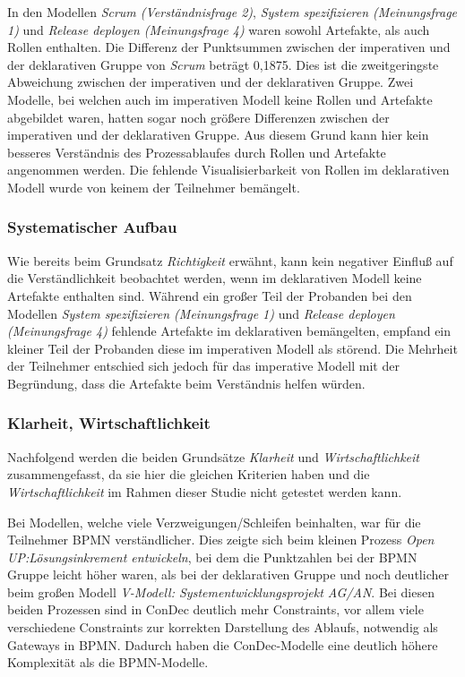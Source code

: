 In den Modellen \textit{Scrum (Verständnisfrage 2)}, \textit{System spezifizieren (Meinungsfrage 1)} und \textit{Release deployen (Meinungsfrage 4)} waren sowohl Artefakte, als auch Rollen enthalten. Die Differenz der Punktsummen zwischen der imperativen und der deklarativen Gruppe von \textit{Scrum} beträgt 0,1875. Dies ist die zweitgeringste Abweichung zwischen der imperativen und der deklarativen Gruppe. Zwei Modelle, bei welchen auch im imperativen Modell keine Rollen und Artefakte abgebildet waren, hatten sogar noch größere Differenzen zwischen der imperativen und der deklarativen Gruppe. Aus diesem Grund kann hier kein besseres Verständnis des Prozessablaufes durch Rollen und Artefakte angenommen werden. \newline
Die fehlende Visualisierbarkeit von Rollen im deklarativen Modell wurde von keinem der Teilnehmer bemängelt.\newline



\subsubsection{Systematischer Aufbau}

Wie bereits beim Grundsatz \textit{Richtigkeit} erwähnt, kann kein negativer Einfluß auf die Verständlichkeit beobachtet werden, wenn im deklarativen Modell keine Artefakte enthalten sind.\newline
Während ein großer Teil der Probanden bei den Modellen \textit{System spezifizieren (Meinungsfrage 1)} und \textit{Release deployen (Meinungsfrage 4)} fehlende Artefakte im deklarativen bemängelten, empfand ein kleiner Teil der Probanden diese im imperativen Modell als störend. Die Mehrheit der Teilnehmer entschied sich jedoch für das imperative Modell mit der Begründung, dass die Artefakte beim Verständnis helfen würden. 

\subsubsection{Klarheit, Wirtschaftlichkeit}



Nachfolgend werden die beiden Grundsätze \textit{Klarheit} und \textit{Wirtschaftlichkeit} zusammengefasst, da sie hier die gleichen Kriterien haben und die \textit{Wirtschaftlichkeit} im Rahmen dieser Studie nicht getestet werden kann.\newline

Bei Modellen, welche viele Verzweigungen/Schleifen beinhalten, war für die Teilnehmer BPMN verständlicher. Dies zeigte sich beim kleinen Prozess \textit{Open UP:Lösungsinkrement entwickeln}, bei dem die Punktzahlen bei der BPMN Gruppe leicht höher waren, als bei der deklarativen Gruppe und noch deutlicher beim großen Modell \textit{V-Modell: Systementwicklungsprojekt AG/AN}. Bei diesen beiden Prozessen sind in ConDec deutlich mehr Constraints, vor allem viele verschiedene Constraints zur korrekten Darstellung des Ablaufs, notwendig als Gateways in BPMN. Dadurch haben die ConDec-Modelle eine deutlich höhere Komplexität als die BPMN-Modelle.\newline

